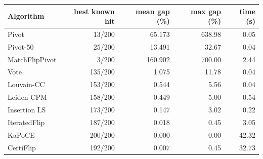 \begin{tabular}{lrrrr}
\toprule
Algorithm & best known hit & mean gap (\%) & max gap (\%) & time (s)\\
\midrule
Pivot & 13/200 & 65.173 & 638.98 & 0.05\\
Pivot-50 & 25/200 & 13.491 & 32.67 & 0.04\\
MatchFlipPivot & 3/200 & 160.902 & 700.00 & 2.44\\
Vote & 135/200 & 1.075 & 11.78 & 0.04\\
Louvain-CC & 153/200 & 0.544 & 5.56 & 0.04\\
Leiden-CPM & 158/200 & 0.449 & 5.00 & 0.54\\
Insertion LS & 173/200 & 0.147 & 3.02 & 0.22\\
IteratedFlip & 187/200 & 0.018 & 0.45 & 3.05\\
KaPoCE & 200/200 & 0.000 & 0.00 & 42.32\\
CertiFlip & 192/200 & 0.007 & 0.45 & 32.73\\
\bottomrule
\end{tabular}
